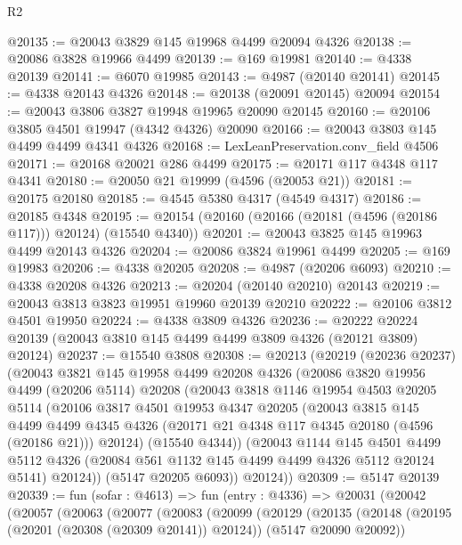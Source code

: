 \begin{lexlean}{R2}
\begin{coremodule}
@20135 := @20043 @3829 @145 @19968 @4499 @20094 @4326
@20138 := @20086 @3828 @19966 @4499
@20139 := @169 @19981
@20140 := @4338 @20139
@20141 := @6070 @19985
@20143 := @4987 (@20140 @20141)
@20145 := @4338 @20143 @4326
@20148 := @20138 (@20091 @20145) @20094
@20154 := @20043 @3806 @3827 @19948 @19965 @20090 @20145
@20160 := @20106 @3805 @4501 @19947 (@4342 @4326) @20090
@20166 := @20043 @3803 @145 @4499 @4499 @4341 @4326
@20168 := LexLeanPreservation.conv_field @4506
@20171 := @20168 @20021 @286 @4499
@20175 := @20171 @117 @4348 @117 @4341
@20180 := @20050 @21 @19999 (@4596 (@20053 @21))
@20181 := @20175 @20180
@20185 := @4545 @5380 @4317 (@4549 @4317)
@20186 := @20185 @4348
@20195 := @20154 (@20160 (@20166 (@20181 (@4596 (@20186 @117))) @20124) (@15540 @4340))
@20201 := @20043 @3825 @145 @19963 @4499 @20143 @4326
@20204 := @20086 @3824 @19961 @4499
@20205 := @169 @19983
@20206 := @4338 @20205
@20208 := @4987 (@20206 @6093)
@20210 := @4338 @20208 @4326
@20213 := @20204 (@20140 @20210) @20143
@20219 := @20043 @3813 @3823 @19951 @19960 @20139 @20210
@20222 := @20106 @3812 @4501 @19950
@20224 := @4338 @3809 @4326
@20236 := @20222 @20224 @20139 (@20043 @3810 @145 @4499 @4499 @3809 @4326 (@20121 @3809) @20124)
@20237 := @15540 @3808
@20308 := @20213
    (@20219
      (@20236 @20237)
      (@20043
        @3821
        @145
        @19958
        @4499
        @20208
        @4326
        (@20086
          @3820
          @19956
          @4499
          (@20206 @5114)
          @20208
          (@20043
            @3818
            @1146
            @19954
            @4503
            @20205
            @5114
            (@20106
              @3817
              @4501
              @19953
              @4347
              @20205
              (@20043
                @3815
                @145
                @4499
                @4499
                @4345
                @4326
                (@20171 @21 @4348 @117 @4345 @20180 (@4596 (@20186 @21)))
                @20124)
              (@15540 @4344))
            (@20043
              @1144
              @145
              @4501
              @4499
              @5112
              @4326
              (@20084 @561 @1132 @145 @4499 @4499 @4326 @5112 @20124 @5141)
              @20124))
          (@5147 @20205 @6093))
        @20124))
@20309 := @5147 @20139
@20339 := fun (sofar : @4613) =>
  fun (entry : @4336) =>
  @20031
    (@20042
      (@20057
        (@20063
          (@20077
            (@20083
              (@20099
                (@20129
                  (@20135
                    (@20148 (@20195 (@20201 (@20308 (@20309 @20141)) @20124)) (@5147 @20090 @20092))

\end{coremodule}
\end{lexlean}
